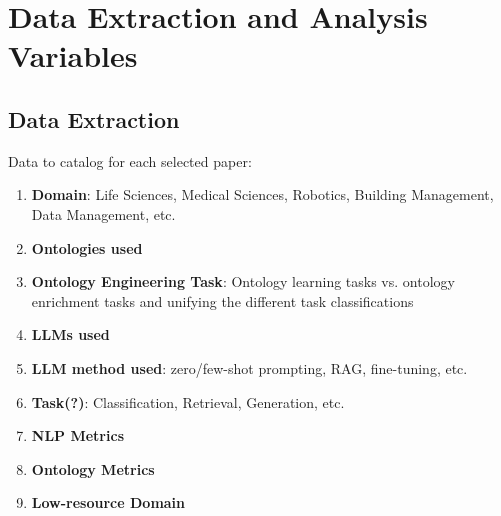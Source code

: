 \documentclass[a4paper,colorinlistoftodos]{article}
\begin{document}

\section{Data Extraction and Analysis Variables}
\label{sec:data-extraction-analysis-variables}

\subsection{Data Extraction}
\label{subsec:data-extraction}

Data to catalog for each selected paper:
\begin{enumerate}
  \item \textbf{Domain}: Life Sciences, Medical Sciences, Robotics, Building
    Management, Data Management, etc.
  \item \textbf{Ontologies used}
  \item \textbf{Ontology Engineering Task}: Ontology learning tasks
    vs. ontology enrichment tasks and unifying the different task
    classifications 
  \item \textbf{LLMs used}
  \item \textbf{LLM method used}: zero/few-shot prompting, RAG, fine-tuning, etc.
  \item \textbf{Task(?)}: Classification, Retrieval, Generation, etc.
  \item \textbf{NLP Metrics}
  \item \textbf{Ontology Metrics}
  \item \textbf{Low-resource Domain}
\end{enumerate}
\end{document}
